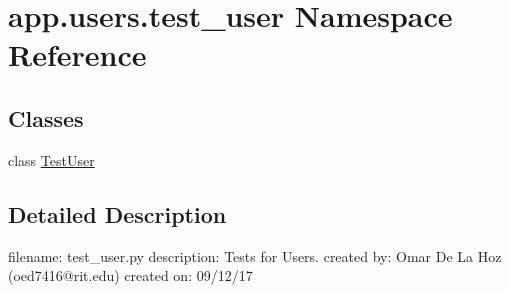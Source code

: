 \hypertarget{namespaceapp_1_1users_1_1test__user}{}\section{app.\+users.\+test\+\_\+user Namespace Reference}
\label{namespaceapp_1_1users_1_1test__user}
\subsection*{Classes}
\begin{DoxyCompactItemize}
\item 
class \mbox{\hyperlink{classapp_1_1users_1_1test__user_1_1_test_user}{Test\+User}}
\end{DoxyCompactItemize}


\subsection{Detailed Description}
\begin{DoxyVerb}filename: test_user.py
description: Tests for Users.
created by: Omar De La Hoz (oed7416@rit.edu)
created on: 09/12/17
\end{DoxyVerb}
 